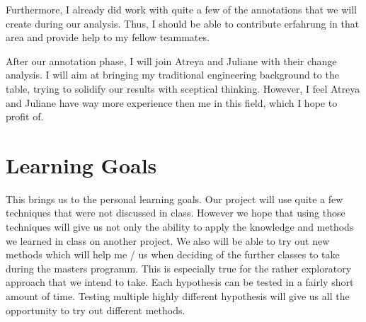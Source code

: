 \documentclass[11pt,a4paper]{article}
\begin{document}
Furthermore, I already did work with quite a few of the annotations that we will create during our analysis. Thus, I should be able to contribute erfahrung in that area and provide help to my fellow teammates. 

After our annotation phase, I will join Atreya and Juliane with their change analysis. I will aim at bringing my traditional engineering background to the table, trying to solidify our results with sceptical thinking. However, I feel Atreya and Juliane have way more experience then me in this field, which I hope to profit of.

\section{Learning Goals}

This brings us to the personal learning goals.
Our project will use quite a few techniques that were not discussed in class. However we hope that using those techniques will give us not only the ability to apply the knowledge and methods we learned in class on another project. 
We also will be able to try out new methods which will help me / us when deciding of the further classes to take during the masters programm. This is especially true for the rather exploratory approach that we intend to take. Each hypothesis can be tested in a fairly short amount of time. Testing multiple highly different hypothesis will give us all the opportunity to try out different methods. 






\end{document}
